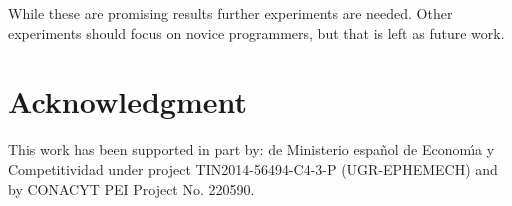 \documentclass[a4paper,twoside]{article}
\begin{document}
While these are promising results further experiments are needed. Other experiments
should focus on novice programmers, but that is left as future
work. %

\section*{Acknowledgment} 
This work has been supported in part by: de Ministerio espa\~{n}ol de Econom\'{\i}a y Competitividad under project TIN2014-56494-C4-3-P (UGR-EPHEMECH) and by CONACYT PEI Project No. 220590.

 


\vfill
\end{document}
